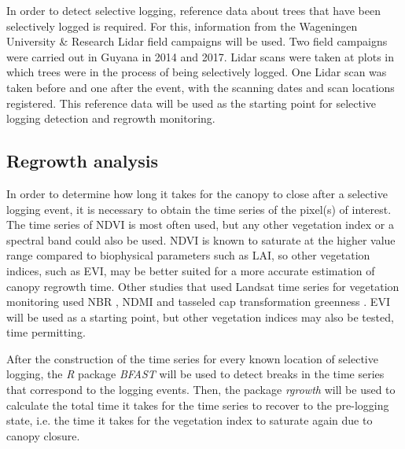 \documentclass[a4paper,10pt]{article}
\newcommand{\ndvi}{\ac{NDVI}}
\newcommand{\lai}{\ac{LAI}}
\newcommand{\evi}{\ac{EVI}}
\begin{document}
In order to detect selective logging, reference data about trees that have been selectively logged is required. For this, information from the Wageningen University \& Research Lidar field campaigns will be used. Two field campaigns were carried out in Guyana in 2014 and 2017. Lidar scans were taken at plots in which trees were in the process of being selectively logged. One Lidar scan was taken before and one after the event, with the scanning dates and scan locations registered. This reference data will be used as the starting point for selective logging detection and regrowth monitoring.

\subsection{Regrowth analysis}

In order to determine how long it takes for the canopy to close after a selective logging event, it is necessary to obtain the time series of the pixel(s) of interest. The time series of \ndvi{} is most often used, but any other vegetation index or a spectral band could also be used. \ndvi{} is known to saturate at the higher value range compared to biophysical parameters such as \lai{}, so other vegetation indices, such as \evi{}, may be better suited for a more accurate estimation of canopy regrowth time. Other studies that used Landsat time series for vegetation monitoring used \ac{NBR} \citep{schneibel_assessment_2017, shimizu_using_2017}, \ac{NDMI} \citep{dutrieux_reconstructing_2016} and tasseled cap transformation greenness \citep{powell_quantification_2010}. \evi{} will be used as a starting point, but other vegetation indices may also be tested, time permitting.

After the construction of the time series for every known location of selective logging, the \textit{R} package \textit{BFAST} \citep{verbesselt_detecting_2010} will be used to detect breaks in the time series that correspond to the logging events. Then, the package \textit{rgrowth} \citep{devries_tracking_2015} will be used to calculate the total time it takes for the time series to recover to the pre-logging state, i.e. the time it takes for the vegetation index to saturate again due to canopy closure.
\end{document}

